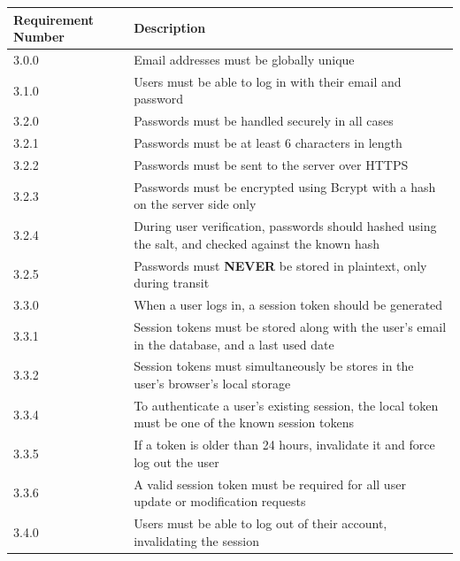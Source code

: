 \documentclass[12pt]{article}
\begin{document}
\setlength{\tabcolsep}{1cm}
\begin{longtable}{|l|p{8cm}|}
    \hline
    Requirement Number & Description                                                                                          \\

    \hline\hline
    3.0.0              & Email addresses must be globally unique                                                              \\

    \hline\hline
    3.1.0              & Users must be able to log in with their email and password                                           \\

    \hline\hline
    3.2.0              & Passwords must be handled securely in all cases                                                      \\
    \hline
    3.2.1              & Passwords must be at least 6 characters in length                                                    \\
    \hline
    3.2.2              & Passwords must be sent to the server over HTTPS                                                      \\
    \hline
    3.2.3              & Passwords must be encrypted using Bcrypt with a hash on the server side only                         \\
    \hline
    3.2.4              & During user verification, passwords should hashed using the salt, and checked against the known hash \\
    \hline
    3.2.5              & Passwords must \textbf{NEVER} be stored in plaintext, only during transit                            \\

    \hline\hline
    3.3.0              & When a user logs in, a session token should be generated                                             \\
    \hline
    3.3.1              & Session tokens must be stored along with the user's email in the database, and a last used date      \\
    \hline
    3.3.2              & Session tokens must simultaneously be stores in the user's browser's local storage                   \\
    \hline
    3.3.4              & To authenticate a user's existing session, the local token must be one of the known session tokens   \\
    \hline
    3.3.5              & If a token is older than 24 hours, invalidate it and force log out the user                          \\
    \hline
    3.3.6              & A valid session token must be required for all user update or modification requests                  \\

    \hline\hline
    3.4.0              & Users must be able to log out of their account, invalidating the session                             \\
    \hline
\end{longtable}
\end{document}
